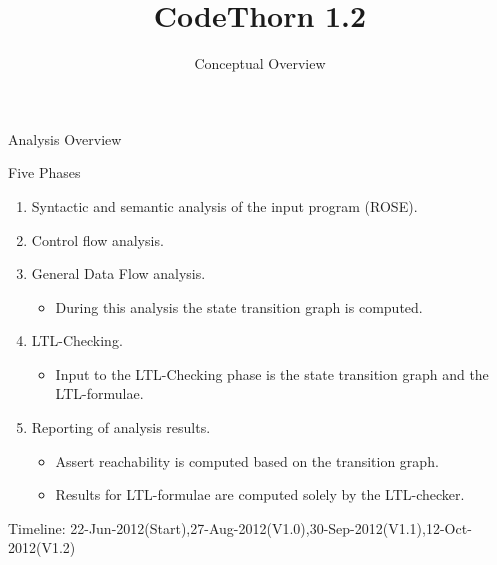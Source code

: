 




\title{CodeThorn 1.2}
\subtitle{Conceptual Overview}


\maketitle


\begin{frame}{Analysis Overview}

\begin{block}{Five Phases}
\begin{enumerate}
\item Syntactic and semantic analysis of the input program (ROSE).
\item Control flow analysis.
\item General Data Flow analysis.
\begin{itemize}
\item During this analysis the state transition graph is computed.
\end{itemize}
\item LTL-Checking. 
\begin{itemize}
\item Input to the LTL-Checking phase is the state transition graph and the LTL-formulae.
\end{itemize}
\item Reporting of analysis results. 
\begin{itemize}
\item Assert reachability is computed based on the transition graph.
\item Results for LTL-formulae are computed solely by the LTL-checker.
\end{itemize}
\end{enumerate}

\end{block}

{\footnotesize
Timeline: 22-Jun-2012(Start),27-Aug-2012(V1.0),30-Sep-2012(V1.1),12-Oct-2012(V1.2)
}
\end{frame}

